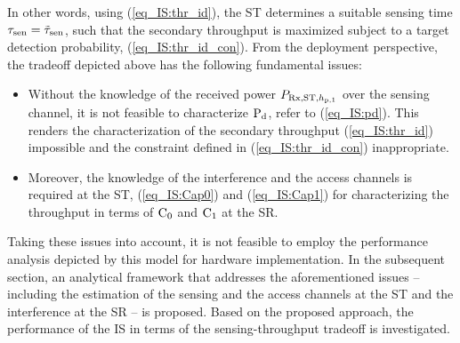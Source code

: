 In other words, using (\ref{eq_IS:thr_id}), the ST determines a suitable sensing time $\tau_{\text{sen}} = \tilde{\tau}_{\text{sen}}$, such that the secondary throughput is maximized subject to a target detection probability,  (\ref{eq_IS:thr_id_con}). From the deployment perspective, the tradeoff depicted above has the following fundamental issues:
\begin{itemize}
\item Without the knowledge of the received power $P_{\text{Rx,ST,$h_{\text{p,1}}$}}$ over the sensing channel, it is not feasible to characterize $\text{P}_{\text{d}}$, refer to (\ref{eq_IS:pd}). This renders the characterization of the secondary throughput (\ref{eq_IS:thr_id}) impossible and the constraint defined in (\ref{eq_IS:thr_id_con}) inappropriate. 
\item Moreover, the knowledge of the interference and the access channels is required at the ST,  (\ref{eq_IS:Cap0}) and (\ref{eq_IS:Cap1}) for characterizing the throughput in terms of $\text{C}_{\text{0}}$ and $\text{C}_{\text{1}}$ at the SR. 
\end{itemize}
Taking these issues into account, it is not feasible to employ the performance analysis depicted by this model  for hardware implementation. In the subsequent section, an analytical framework  that addresses the aforementioned issues -- including the estimation of the sensing and the access channels at the ST and the interference at the SR -- is proposed. Based on the proposed approach, the performance of the IS in terms of the sensing-throughput tradeoff is investigated. 

\subsection{} \label{ssec_IS:pa}

